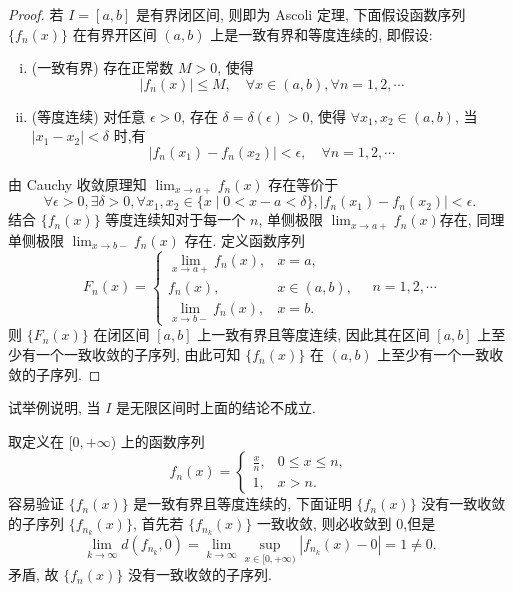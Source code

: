 \begin{proof}
  若 $I=[a,b]$ 是有界闭区间, 则即为 Ascoli 定理, 
  下面假设函数序列 $\{f_n(x)\}$ 在有界开区间 $(a,b)$ 上是一致有界和等度连续的, 即假设:
  \begin{enumerate}[(i)]
  \item (一致有界) 存在正常数 $M>0$, 使得
    \[|f_n(x)|\leq M,\quad\forall x\in(a,b),\forall n=1,2,\cdots\]
  \item (等度连续) 对任意 $\epsilon>0$, 存在 $\delta=\delta(\epsilon)>0$,
    使得 $\forall x_1,x_2\in(a,b)$, 当 $|x_1-x_2|<\delta$ 时,有
    \[|f_n(x_1)-f_n(x_2)|<\epsilon,\quad\forall n=1,2,\cdots\]
  \end{enumerate}
  由 Cauchy 收敛原理知 $\lim_{x\to a+}f_n(x)$ 存在等价于
  \[\forall\epsilon>0,\exists\delta>0,
    \forall x_1,x_2\in\{x\mid 0<x-a<\delta\},|f_n(x_1)-f_n(x_2)|<\epsilon.\]
  结合 $\{f_n(x)\}$ 等度连续知对于每一个 $n$, 单侧极限 $\displaystyle\lim_{x\to a+}f_n(x)$存在, 
  同理单侧极限 $\displaystyle\lim_{x\to b-}f_n(x)$ 存在. 定义函数序列
  \[F_n(x)=
  \begin{cases}
    \lim\limits_{x\to a+}f_n(x), & x=a,\\
    f_n(x),                      & x\in (a,b),\\
    \lim\limits_{x\to b-}f_n(x), & x=b.
  \end{cases}\quad n=1,2,\cdots\]
  则 $\{F_n(x)\}$ 在闭区间 $[a,b]$ 上一致有界且等度连续, 因此其在区间 $[a,b]$ 上至少有一个一致收敛的子序列,
  由此可知 $\{f_n(x)\}$ 在 $(a,b)$ 上至少有一个一致收敛的子序列.
\end{proof}



\begin{exercise}
  试举例说明, 当 $I$ 是无限区间时上面的结论不成立.
\end{exercise}

\begin{solution}
  取定义在 $[0,+\infty)$ 上的函数序列
  \[f_n(x)=
    \begin{cases}
      \frac{x}{n}, & 0\leq x\leq n,\\
      1,           & x>n.
    \end{cases}\]
  容易验证 $\{f_n(x)\}$ 是一致有界且等度连续的,
  下面证明 $\{f_n(x)\}$ 没有一致收敛的子序列 $\{f_{n_k}(x)\}$,
  首先若 $\{f_{n_k}(x)\}$ 一致收敛, 则必收敛到 $0$,但是
  \[\lim_{k\to\infty}d(f_{n_k},0)=\lim_{k\to\infty}\sup_{x\in[0,+\infty)}|f_{n_k}(x)-0|=1\neq 0.\]
  矛盾, 故 $\{f_n(x)\}$ 没有一致收敛的子序列.
\end{solution}



